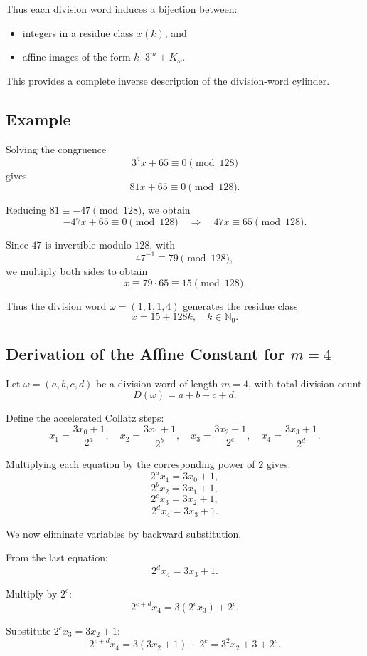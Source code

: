 \documentclass[12pt, oneside]{article}   	%
\numberwithin{equation}{section}          %
\theoremstyle{definition}
\begin{document}
Thus each division word induces a bijection between:
\begin{itemize}
\item integers in a residue class $x(k)$, and
\item affine images of the form $k\cdot 3^m + K_\omega$.
\end{itemize}

This provides a complete inverse description of the division-word cylinder.

\subsection{Example}
Solving the congruence
\[
3^4 x + 65 \equiv 0 \pmod{128}
\]
gives
\[
81x + 65 \equiv 0 \pmod{128}.
\]

Reducing $81 \equiv -47 \pmod{128}$, we obtain
\[
-47x + 65 \equiv 0 \pmod{128}
\quad \Longrightarrow \quad
47x \equiv 65 \pmod{128}.
\]

Since $47$ is invertible modulo $128$, with
\[
47^{-1} \equiv 79 \pmod{128},
\]
we multiply both sides to obtain
\[
x \equiv 79 \cdot 65 \equiv 15 \pmod{128}.
\]

Thus the division word $\omega = (1,1,1,4)$ generates the residue class
\[
x = 15 + 128k, \quad k \in \mathbb{N}_0.
\]


\subsection{Derivation of the Affine Constant for $m=4$}

Let $\omega = (a,b,c,d)$ be a division word of length $m=4$, with total division count
\[
D(\omega) = a + b + c + d.
\]

Define the accelerated Collatz steps:
\[
x_1 = \frac{3x_0+1}{2^a}, \quad
x_2 = \frac{3x_1+1}{2^b}, \quad
x_3 = \frac{3x_2+1}{2^c}, \quad
x_4 = \frac{3x_3+1}{2^d}.
\]

Multiplying each equation by the corresponding power of $2$ gives:
\[
2^a x_1 = 3x_0 + 1,
\]
\[
2^b x_2 = 3x_1 + 1,
\]
\[
2^c x_3 = 3x_2 + 1,
\]
\[
2^d x_4 = 3x_3 + 1.
\]

\medskip

We now eliminate variables by backward substitution.

\medskip

From the last equation:
\[
2^d x_4 = 3x_3 + 1.
\]

Multiply by $2^c$:
\[
2^{c+d} x_4 = 3(2^c x_3) + 2^c.
\]

Substitute $2^c x_3 = 3x_2 + 1$:
\[
2^{c+d} x_4 = 3(3x_2 + 1) + 2^c
= 3^2 x_2 + 3 + 2^c.
\]
\end{document}
